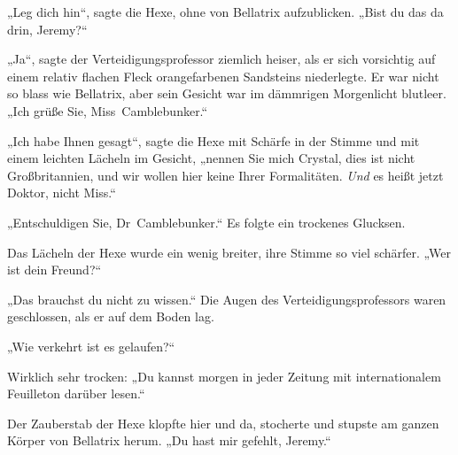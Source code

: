 „Leg dich hin“, sagte die Hexe, ohne von Bellatrix aufzublicken. „Bist du das da drin, Jeremy?“

„Ja“, sagte der Verteidigungsprofessor ziemlich heiser, als er sich vorsichtig auf einem relativ flachen Fleck orangefarbenen Sandsteins niederlegte. Er war nicht so blass wie Bellatrix, aber sein Gesicht war im dämmrigen Morgenlicht blutleer. „Ich grüße Sie, Miss~Camblebunker.“

„Ich habe Ihnen gesagt“, sagte die Hexe mit Schärfe in der Stimme und mit einem leichten Lächeln im Gesicht, „nennen Sie mich Crystal, dies ist nicht Großbritannien, und wir wollen hier keine Ihrer Formalitäten. \emph{Und} es heißt jetzt Doktor, nicht Miss.“

„Entschuldigen Sie, Dr~Camblebunker.“ Es folgte ein trockenes Glucksen.

Das Lächeln der Hexe wurde ein wenig breiter, ihre Stimme so viel schärfer. „Wer ist dein Freund?“

„Das brauchst du nicht zu wissen.“ Die Augen des Verteidigungsprofessors waren geschlossen, als er auf dem Boden lag.

„Wie verkehrt ist es gelaufen?“

Wirklich sehr trocken: „Du kannst morgen in jeder Zeitung mit internationalem Feuilleton darüber lesen.“

Der Zauberstab der Hexe klopfte hier und da, stocherte und stupste am ganzen Körper von Bellatrix herum. „Du hast mir gefehlt, Jeremy.“

